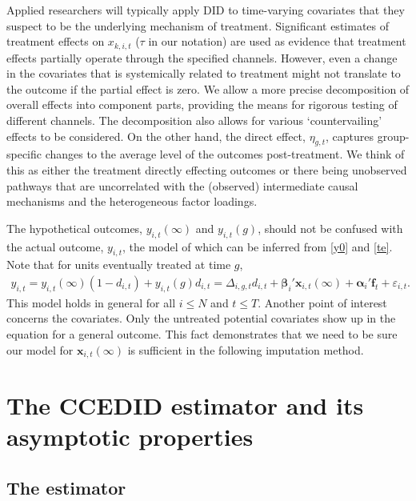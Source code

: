 \documentclass[12pt,fleqn]{article}
\def\*#1{\mathbf{#1}}
\def\+#1{\boldsymbol{#1}}
\begin{document}
Applied researchers will typically apply DID to time-varying covariates that they suspect to be the underlying mechanism of treatment. Significant estimates of treatment effects on $x_{k,i,t}$ ($\tau$ in our notation) are used as evidence that treatment effects partially operate through the specified channels. However, even a change in the covariates that is systemically related to treatment might not translate to the outcome if the partial effect is zero. We allow a more precise decomposition of overall effects into component parts, providing the means for rigorous testing of different channels. The decomposition also allows for various `countervailing' effects to be considered. On the other hand, the direct effect, $\eta_{g,t}$, captures group-specific changes to the average level of the outcomes post-treatment. We think of this as either the treatment directly effecting outcomes or there being unobserved pathways that are uncorrelated with the (observed) intermediate causal mechanisms and the heterogeneous factor loadings. 

The hypothetical outcomes, $y_{i,t}(\infty)$ and $y_{i,t}(g)$, should not be confused with the actual outcome, $y_{i,t}$, the model of which can be inferred from \eqref{y0} and \eqref{te}. Note that for units eventually treated at time $g$,
\begin{align}
y_{i,t} = y_{i,t}(\infty)(1-d_{i,t}) + y_{i,t}(g)d_{i,t}  = \Delta_{i,g,t}d_{i,t} + \+\beta_i'\*x_{i,t}(\infty) + \+\alpha_i'\*f_t + \varepsilon_{i,t}. \label{y}
\end{align}
This model holds in general for all $i \leq N$ and $t \leq T$. Another point of interest concerns the covariates. Only the untreated potential covariates show up in the equation for a general outcome. This fact demonstrates that we need to be sure our model for $\*x_{i,t}(\infty)$ is sufficient in the following imputation method.




\section{The CCEDID estimator and its asymptotic properties}

\subsection{The estimator}
\end{document}
